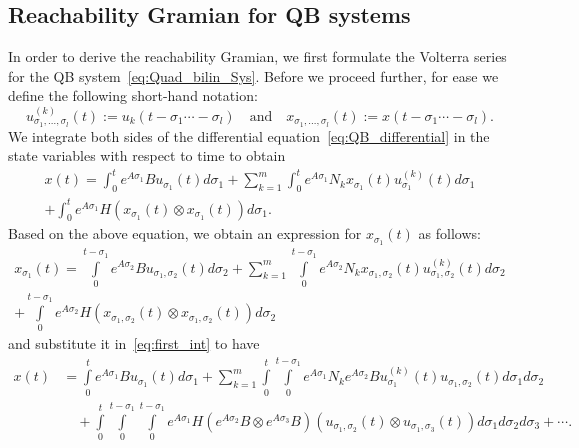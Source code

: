 \subsection{Reachability Gramian for QB systems}
In order to derive the reachability Gramian, we first formulate the Volterra series for the QB system~\eqref{eq:Quad_bilin_Sys}. Before we proceed further, for ease we define the following short-hand notation:
\begin{equation*}
u^{(k)}_{\sigma_1,\ldots ,\sigma_l}(t) := u_k(t-\sigma_1 \cdots -\sigma_l)\quad\mbox{and}\quad x_{\sigma_1,\ldots ,\sigma_l}(t) := x(t-\sigma_1 \cdots -\sigma_l).
\end{equation*}
We integrate  both sides of the differential equation~\eqref{eq:QB_differential} in the state variables with respect to time  to obtain
\begin{multline}\label{eq:first_int}
x(t) = \int\nolimits_0^te^{A\sigma_1}Bu_{\sigma_1}(t)d\sigma_1 +  \sum_{k=1}^m \int\nolimits_0^te^{A\sigma_1} N_kx_{\sigma_1}(t)u^{(k)}_{\sigma_1}(t)d\sigma_1 \\ +\int\nolimits_0^te^{A\sigma_1}H\left(x_{\sigma_1}(t)\otimes x_{\sigma_1}(t)\right)d\sigma_1.
\end{multline}
Based on the above equation, we obtain an expression for $x_{\sigma_1}(t)$ as follows:
\begin{multline*}
x_{\sigma_1}(t) = \int\limits_0^{t-\sigma_1}e^{A\sigma_2}Bu_{\sigma_1,\sigma_2}(t)d\sigma_2 +\sum_{k=1}^m \int\limits_0^{t-\sigma_1}e^{A\sigma_2}N_kx_{\sigma_1,\sigma_2}(t)u^{(k)}_{\sigma_1,\sigma_2}(t)d\sigma_2 \\
 + \int\limits_0^{t-\sigma_1}e^{A\sigma_2}H\left(x_{\sigma_1,\sigma_2}(t)\otimes x_{\sigma_1,\sigma_2}(t)\right)d\sigma_2
\end{multline*}
and substitute it in~\eqref{eq:first_int} to have
\begin{equation*}
\begin{aligned}
x(t) &= \int\limits_{0}^t {e^{A\sigma_1}B}u_{\sigma_1}(t)d\sigma_1 +\sum_{k=1}^m\int\limits_{0}^t\int\limits_{0}^{t-\sigma_1} {e^{A\sigma_1}N_ke^{A\sigma_2} B} u^{(k)}_{\sigma_1}(t)u^{}_{\sigma_1,\sigma_2}(t)d\sigma_1d\sigma_2 \\
 &\quad+ \int\limits_{0}^t\int\limits_{0}^{t-\sigma_1}\int\limits_{0}^{t-\sigma_1} {e^{A\sigma_1} H (e^{A\sigma_2}B\otimes e^{A\sigma_3}B)}\left(u_{\sigma_1,\sigma_2}(t) \otimes u_{\sigma_1,\sigma_3}(t)\right)d\sigma_1d\sigma_2d\sigma_3 
  +\cdots.
 \end{aligned}
\end{equation*}
